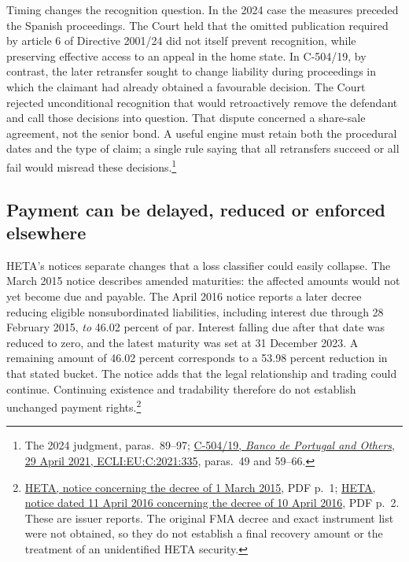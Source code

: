 Timing changes the recognition question. In the 2024 case the measures
preceded the Spanish proceedings. The Court held that the omitted publication
required by article 6 of Directive 2001/24 did not itself prevent recognition,
while preserving effective access to an appeal in the home state.
In C-504/19, by contrast, the later retransfer sought to change liability
during proceedings in which the claimant had already obtained a favourable
decision. The Court rejected unconditional recognition that would
retroactively remove the defendant and call those decisions into question.
That dispute concerned a share-sale agreement, not the senior bond.
A useful engine must retain both the procedural dates and the type of claim;
a single rule saying that all retransfers succeed or all fail would misread
these decisions.\footnote{The 2024 judgment, paras.~89--97;
\href{../prospectus/corner-cases-2026-10-04/sources/jur-more-novo2021-judgment/source.html}
{C-504/19, \emph{Banco de Portugal and Others}, 29 April 2021,
ECLI:EU:C:2021:335}, paras.~49 and 59--66.}

\subsection{Payment can be delayed, reduced or enforced elsewhere}

HETA's notices separate changes that a loss classifier could easily collapse.
The March 2015 notice describes amended maturities: the affected amounts
would not yet become due and payable. The April 2016 notice reports a later
decree reducing eligible nonsubordinated liabilities, including interest
due through 28 February 2015, \emph{to} 46.02 percent of par. Interest falling
due after that date was reduced to zero, and the latest maturity was set at
31 December 2023. A remaining amount of 46.02 percent corresponds to a
53.98 percent reduction in that stated bucket. The notice adds that the
legal relationship and trading could continue. Continuing existence and
tradability therefore do not establish unchanged payment rights.\footnote{
\href{../prospectus/corner-cases-2026-10-04/sources/jur-more-heta-2356087/source.pdf}
{HETA, notice concerning the decree of 1 March 2015}, PDF p.~1;
\href{../prospectus/corner-cases-2026-10-04/sources/jur-more-heta-2789331/source.pdf}
{HETA, notice dated 11 April 2016 concerning the decree of 10 April 2016},
PDF p.~2. These are issuer reports. The original FMA decree and exact
instrument list were not obtained, so they do not establish a final recovery
amount or the treatment of an unidentified HETA security.}

